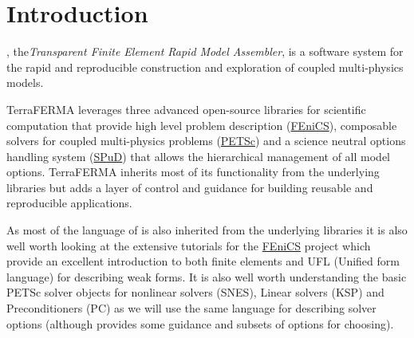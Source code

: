 %
%
%
%
%

\chapter{Introduction}

\TF{},  the\emph{Transparent Finite Element Rapid Model Assembler}, is
a software system for the rapid and reproducible construction and exploration of coupled multi-physics models.

TerraFERMA leverages three advanced open-source libraries for
scientific computation that provide high level problem description
(\href{http://fenicsproject.org}{FEniCS}), composable solvers for
coupled multi-physics problems
(\href{https://www.mcs.anl.gov/petsc}{PETSc}) and a science neutral
options handling system
(\href{http://www3.imperial.ac.uk/earthscienceandengineering/research/amcg/spud}{SPuD})
that allows the hierarchical management of all model
options. TerraFERMA inherits most of its functionality from the
underlying libraries but adds a layer of control and guidance for
building reusable and reproducible applications.

As most of the language of \TF{} is also inherited from the underlying
libraries it is also well worth looking at the extensive tutorials for
the \href{http://fenicsproject.org/documentation/tutorial}{FEniCS} project which provide an
excellent introduction to both finite elements and UFL (Unified form
language) for describing weak forms.  It is also well worth
understanding the basic PETSc solver objects for nonlinear solvers
(SNES), Linear solvers (KSP) and Preconditioners (PC) as we will use
the same language for describing solver options (although \TF{}
provides some guidance and subsets of options for choosing).

